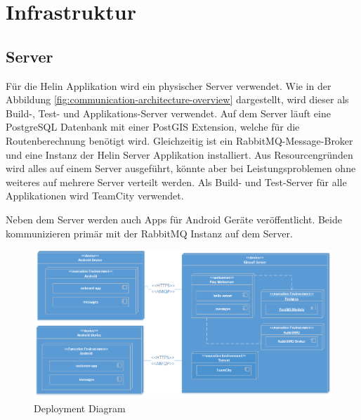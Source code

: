 \newpage

\chapter{Infrastruktur}

\section{Server}

Für die Helin Applikation wird ein physischer Server verwendet. Wie in der Abbildung \ref{fig:communication-architecture-overview} dargestellt, wird dieser als Build-, Test- und Applikations-Server verwendet. 
Auf dem Server läuft eine PostgreSQL Datenbank mit einer PostGIS Extension, welche für die Routenberechnung benötigt wird. Gleichzeitig ist ein RabbitMQ-Message-Broker und eine Instanz der Helin Server Applikation installiert. Aus Resourcengründen wird alles auf einem Server ausgeführt, könnte aber bei Leistungsproblemen ohne weiteres auf mehrere Server verteilt werden. Als Build- und Test-Server für alle Applikationen wird TeamCity verwendet. 

Neben dem Server werden auch Apps für Android Geräte veröffentlicht. Beide kommunizieren primär mit der RabbitMQ Instanz auf dem Server.

\begin{figure}[h]
	\includegraphics[width=1.0\textwidth]{images/DeploymentDiagram.png}
	\caption{Deployment Diagram}
	\label{fig:deployment-diagram}
\end{figure}


